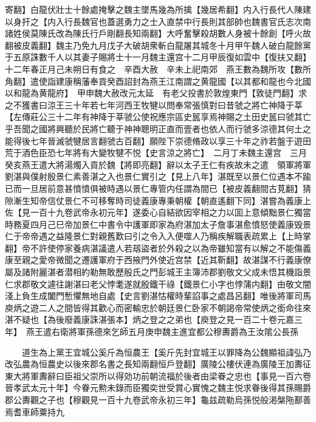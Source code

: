 寄翻】白龍伏壯士十餘處掩擊之魏主墜馬幾為所擒【幾居希翻】内入行長代人陳建以身扞之【内入行長魏官也蓋選勇力之士入直禁中行長則其部帥也魏書官氏志次南諸姓侯莫陳氏改為陳氏行戶剛翻長知兩翻】大呼奮擊殺胡數人身被十餘創【呼火故翻被皮義翻】魏主乃免九月戊子大破胡衆斬白龍屠其城冬十月甲午魏人破白龍餘黨于五原誅數千人以其妻子賜將士十一月魏主還宫十二月甲辰復如雲中【復扶又翻】十二年春正月己未朔日有食之　辛酉大赦　辛未上祀南郊　燕王數為魏所攻【數所角翻】遣使詣建康稱藩奉貢癸酉詔封為燕王江南謂之黄龍國【以其都和龍也今北國以和龍為黄龍府】　甲申魏大赦改元太延　有老父投書於敦煌東門【敦徒門翻】求之不獲書曰涼王三十年若七年河西王牧犍以問奉常張慎對曰昔虢之將亡神降于莘【左傳莊公三十二年有神降于莘虢公使祝應宗區史嚚享焉神賜之土田史嚚曰虢其亡乎吾聞之國將興聽於民將亡聽于神神聰明正直而壹者也依人而行虢多涼德其何土之能得後七年晉滅虢犍居言翻虢古百翻】願陛下崇德脩政以享三十年之祚若盤于遊田荒于酒色臣恐七年將有大變牧犍不悦【史言涼之將亡】　二月丁未魏主還宫　三月癸亥燕王遣大將湯燭入貢於魏【將即亮翻】辭以太子王仁有疾故未之遣　領軍將軍劉湛與僕射殷景仁素善湛之入也景仁實引之【見上八年】湛既至以景仁位遇本不踰已而一旦居前意甚憤憤俱被時遇以景仁專管内任謂為間已【被皮義翻間古莧翻】猜隙漸生知帝信仗景仁不可移奪時司徒義康專秉朝權【朝直遙翻下同】湛嘗為義康上佐【見一百十九卷武帝永初元年】遂委心自結欲因宰相之力以囬上意傾黜景仁獨當時務夏四月己巳帝加景仁中書令中護軍即家為府湛加太子詹事湛愈憤怒使義康毁景仁于帝帝遇之益隆景仁對親舊歎曰引之令入入便噬人乃稱疾解職表疏累上【上時掌翻】帝不許使停家養病湛議遣人若刼盜者於外殺之以為帝雖知當有以解之不能傷義康至親之愛帝微聞之遷護軍府于西掖門外使近宫禁【近其靳翻】故湛謀不行義康僚屬及諸附麗湛者潜相約勒無敢歷殷氏之門彭城王主簿沛郡劉敬文父成未悟其機詣景仁求郡敬文遽往謝湛曰老父悖耄遂就殷鐵干祿【鐵景仁小字也悖蒲内翻】由敬文闇淺上負生成闔門慙懼無地自處【史言劉湛怙權時輩諂事之處昌呂翻】唯後將軍司馬庾炳之遊二人之間皆得其歡心而密輸忠於朝廷景仁卧家不朝謁帝常使炳之銜命往來湛不疑也【為後廢義康誅湛張本】炳之登之之弟也【庾登之見一百二十卷元嘉三年】　燕王遣右衛將軍孫德來乞師五月庚申魏主進宜都公穆夀爵為王汝隂公長孫

　　道生為上黨王宜城公奚斤為恒農王【奚斤先封宜城王以罪降為公魏顯祖諱弘乃改弘農為恒農史以後來郡名書之長知兩翻恒戶登翻】廣陵公樓伏連為廣陵王加夀征東大將軍夀辭曰臣祖父崇所以得効功前朝流福於後者由梁眷之忠也【事見一百六卷晉孝武太元十年】今眷元勲未錄而臣獨奕世受賞心實愧之魏主悦求眷後得其孫賜爵郡公夀觀之子也【穆觀見一百十九卷武帝永初三年】龜兹疏勒烏孫悦般渇槃陁鄯善焉耆車師粟持九


